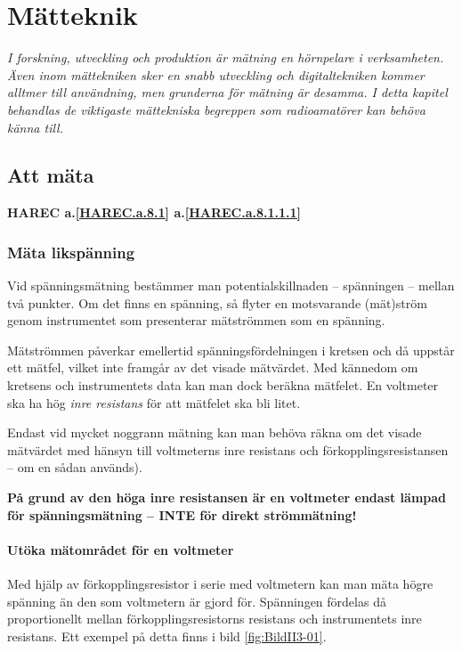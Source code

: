 \chapter{Mätteknik}

\emph{I forskning, utveckling och produktion är mätning en hörnpelare
  i verksamheten. Även inom mättekniken sker en snabb utveckling och
  digitaltekniken kommer alltmer till användning, men grunderna för
  mätning är desamma. I detta kapitel behandlas de viktigaste
  mättekniska begreppen som radioamatörer kan behöva känna till.}

\section{Att mäta}
\textbf{HAREC
  a.\ref{HAREC.a.8.1}\label{myHAREC.a.8.1}
  a.\ref{HAREC.a.8.1.1.1}\label{myHAREC.a.8.1.1.1}
}

\subsection{Mäta likspänning}

Vid spänningsmätning bestämmer man potentialskillnaden -- spänningen --
mellan två punkter.
Om det finns en spänning, så flyter en motsvarande (mät)ström genom
instrumentet som presenterar mätströmmen som en spänning.

Mätströmmen påverkar emellertid spänningsfördelningen i kretsen och då
uppstår ett mätfel, vilket inte framgår av det visade mätvärdet.
Med kännedom om kretsens och instrumentets data kan man dock beräkna mätfelet.
En voltmeter ska ha hög \emph{inre resistans} för att mätfelet ska bli litet.

Endast vid mycket noggrann mätning kan man behöva räkna om det visade
mätvärdet med hänsyn till voltmeterns inre resistans och
förkopplingsresistansen -- om en sådan används).

\textbf{På grund av den höga inre resistansen är en voltmeter endast lämpad
  för spänningsmätning -- INTE för direkt strömmätning!}

\subsubsection{Utöka mätområdet för en voltmeter}

Med hjälp av förkopplingsresistor i serie med voltmetern kan man mäta
högre spänning än den som voltmetern är gjord för.
Spänningen fördelas då proportionellt mellan förkopplingsresistorns resistans
och instrumentets inre resistans.
Ett exempel på detta finns i bild \ref{fig:BildII3-01}.

